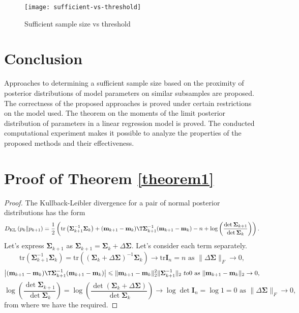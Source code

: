 \documentclass[runningheads]{llncs}
\begin{document}
\begin{figure}[ht]
    \centering
    \texttt{[image: sufficient-vs-threshold]}
    \caption{Sufficient sample size vs threshold}
    \label{sufficient-vs-threshold}
\end{figure}

\section{Conclusion}

Approaches to determining a sufficient sample size based on the proximity of posterior distributions of model parameters on similar subsamples are proposed. The correctness of the proposed approaches is proved under certain restrictions on the model used. The theorem on the moments of the limit posterior distribution of parameters in a linear regression model is proved. The conducted computational experiment makes it possible to analyze the properties of the proposed methods and their effectiveness.

%
%
%
\clearpage


%

\clearpage
\appendix

\section{Proof of Theorem \ref{theorem1}}
\begin{proof}
The Kullback-Leibler divergence for a pair of normal posterior distributions has the form
    \[ D_{\text{KL}}\left( p_k \| p_{k+1} \right) = \dfrac{1}{2} \left( \mathrm{tr}\left( \mathbf{\Sigma}_{k+1}^{-1} \mathbf{\Sigma}_k \right) + (\mathbf{m}_{k+1} - \mathbf{m}_k)\T \mathbf{\Sigma}_{k+1}^{-1} (\mathbf{m}_{k+1} - \mathbf{m}_k) - n + \log{\left( \dfrac{\det \mathbf{\Sigma}_{k+1}}{\det \mathbf{\Sigma}_{k}} \right)} \right). \]
    Let's express $\mathbf{\Sigma}_{k+1}$ as $\mathbf{\Sigma}_{k+1} = \mathbf{\Sigma}_k + \Delta\mathbf{\Sigma}$. Let's consider each term separately.
    \[ \mathrm{tr}\left( \mathbf{\Sigma}_{k+1}^{-1} \mathbf{\Sigma}_k \right) = \mathrm{tr}\left(\left(\mathbf{\Sigma}_k + \Delta \mathbf{\Sigma} \right)^{-1} \mathbf{\Sigma}_k \right) \to \mathrm{tr}\mathbf{I}_n=n\text{ as } \| \Delta \mathbf{\Sigma} \|_F \to 0, \]
    \[ \left| (\mathbf{m}_{k+1} - \mathbf{m}_k)\T\mathbf{\Sigma}_{k+1}^{-1} (\mathbf{m}_{k+1} - \mathbf{m}_k) \right| \leqslant\| \mathbf{m}_{k+1} -\mathbf{m}_k\|_2^2\|\mathbf{\Sigma}_{k+1}^{-1} \|_2 \ to 0 \text{ as } \| \mathbf{m}_{k+1} - \mathbf{m}_k\|_2 \to 0, \]
    \[ \log{\left( \dfrac{\det \mathbf{\Sigma}_{k+1}}{\det \mathbf{\Sigma}_{k}} \right)} = \log{\left( \dfrac{\det \left( \mathbf{\Sigma}_k + \Delta \mathbf{\Sigma} \right)}{\det\mathbf{\Sigma}_{k}} \right)} \to \log \det\mathbf{I}_n = \log 1 = 0 \text{ as } \| \Delta \mathbf{\Sigma} \|_F\to 0, \]
    from where we have the required.
\end{proof}
\end{document}
